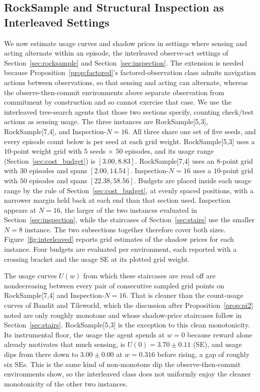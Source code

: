 \subsection{RockSample and Structural Inspection as Interleaved Settings}
\label{sec:interleaved_budget}

We now estimate usage curves and shadow prices in settings where sensing and acting alternate within an episode, the interleaved observe-act settings of Section~\ref{sec:rocksample} and Section~\ref{sec:inspection}. The extension is needed because Proposition~\ref{prop:factored}'s factored-observation class admits navigation actions between observations, so that sensing and acting can alternate, whereas the observe-then-commit environments above separate observation from commitment by construction and so cannot exercise that case. We use the interleaved tree-search agents that those two sections specify, counting check/test actions as sensing usage. The three instances are RockSample[5,3], RockSample[7,4], and Inspection-$N{=}16$. All three share one set of five seeds, and every episode count below is per seed at each grid weight. RockSample[5,3] uses a $10$-point weight grid with $5$ seeds $\times$ $50$ episodes, and its usage range (Section~\ref{sec:cost_budget}) is $[3.00, 8.83]$. RockSample[7,4] uses an $8$-point grid with $30$ episodes and spans $[2.00, 14.54]$. Inspection-$N{=}16$ uses a $10$-point grid with $50$ episodes and spans $[22.38, 58.56]$. Budgets are placed inside each usage range by the rule of Section~\ref{sec:cost_budget}, at evenly spaced positions, with a narrower margin held back at each end than that section used. Inspection appears at $N{=}16$, the larger of the two instances evaluated in Section~\ref{sec:inspection}, while the staircases of Section~\ref{sec:stairs} use the smaller $N{=}8$ instance. The two subsections together therefore cover both sizes. Figure~\ref{fig:interleaved} reports grid estimates of the shadow prices for each instance. Four budgets are evaluated per environment, each reported with a crossing bracket and the usage SE at its plotted grid weight.

The usage curves $U(w)$ from which these staircases are read off are nondecreasing between every pair of consecutive sampled grid points on RockSample[7,4] and Inspection-$N{=}16$. That is cleaner than the count-usage curves of Bandit and Tileworld, which the discussion after Proposition~\ref{prop:pi2} noted are only roughly monotone and whose shadow-price staircases follow in Section~\ref{sec:stairs}. RockSample[5,3] is the exception to this clean monotonicity. Its instrumental floor, the usage the agent spends at $w{=}0$ because reward alone already motivates that much sensing, is $U(0){=}3.70 \pm 0.11$ (SE), and usage dips from there down to $3.00 \pm 0.00$ at $w{=}0.316$ before rising, a gap of roughly six SEs. This is the same kind of non-monotone dip the observe-then-commit environments show, so the interleaved class does not uniformly enjoy the cleaner monotonicity of the other two instances.

